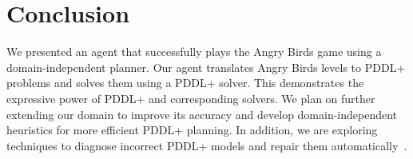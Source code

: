 \documentclass[letterpaper]{article} %
\begin{document}
\section{Conclusion}




We presented an agent that successfully plays the Angry Birds game  using a domain-independent planner.
Our agent translates Angry Birds levels to PDDL+ problems and solves them using a PDDL+ solver.
This demonstrates the expressive power of PDDL+ and corresponding solvers.
We plan on further extending our domain to improve its accuracy and develop domain-independent heuristics for more efficient PDDL+ planning.
In addition, we are exploring techniques to diagnose incorrect PDDL+ models and repair them automatically~\cite{klenk2020model}.



\end{document}

